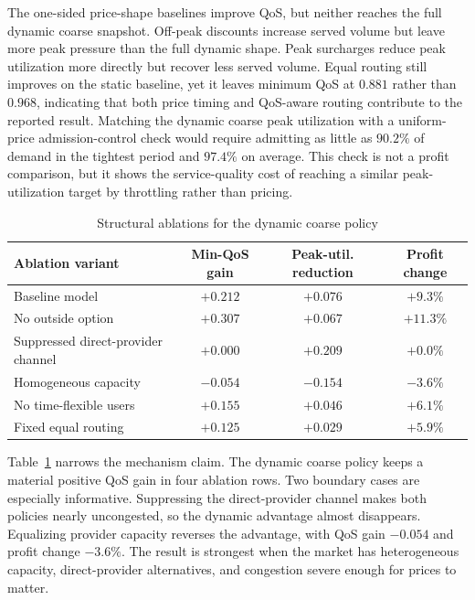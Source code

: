 \documentclass[11pt,a4paper]{article}
\begin{document}
The one-sided price-shape baselines improve QoS, but neither reaches the full dynamic coarse snapshot. Off-peak discounts increase served volume but leave more peak pressure than the full dynamic shape. Peak surcharges reduce peak utilization more directly but recover less served volume. Equal routing still improves on the static baseline, yet it leaves minimum QoS at $0.881$ rather than $0.968$, indicating that both price timing and QoS-aware routing contribute to the reported result. Matching the dynamic coarse peak utilization with a uniform-price admission-control check would require admitting as little as $90.2\%$ of demand in the tightest period and $97.4\%$ on average. This check is not a profit comparison, but it shows the service-quality cost of reaching a similar peak-utilization target by throttling rather than pricing.

\begin{table}[H]
\centering
\caption{Structural ablations for the dynamic coarse policy}
\label{tab:structural_ablations}
\small
\begin{tabular}{lccc}
\toprule
Ablation variant & Min-QoS gain & Peak-util. reduction & Profit change \\
\midrule
Baseline model & $+0.212$ & $+0.076$ & $+9.3\%$ \\
No outside option & $+0.307$ & $+0.067$ & $+11.3\%$ \\
Suppressed direct-provider channel & $+0.000$ & $+0.209$ & $+0.0\%$ \\
Homogeneous capacity & $-0.054$ & $-0.154$ & $-3.6\%$ \\
No time-flexible users & $+0.155$ & $+0.046$ & $+6.1\%$ \\
Fixed equal routing & $+0.125$ & $+0.029$ & $+5.9\%$ \\
\bottomrule
\end{tabular}
\end{table}

Table~\ref{tab:structural_ablations} narrows the mechanism claim. The dynamic coarse policy keeps a material positive QoS gain in four ablation rows. Two boundary cases are especially informative. Suppressing the direct-provider channel makes both policies nearly uncongested, so the dynamic advantage almost disappears. Equalizing provider capacity reverses the advantage, with QoS gain $-0.054$ and profit change $-3.6\%$. The result is strongest when the market has heterogeneous capacity, direct-provider alternatives, and congestion severe enough for prices to matter.
\end{document}

